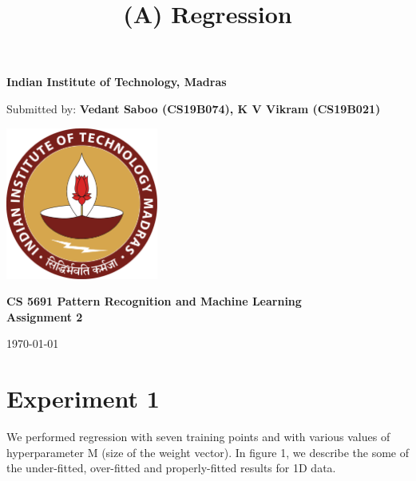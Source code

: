 \documentclass[11pt]{article}
\begin{document}
\begin{titlepage}


\setlength{\droptitle}{-4em} 
\center

{\huge \bfseries Indian Institute of Technology, Madras} %
\\[2cm] 


\begin{minipage}{0.8\textwidth}
\begin{center} \large
Submitted by: \textbf{Vedant Saboo (CS19B074), K V Vikram (CS19B021)} %
\end{center}
\end{minipage} 

\vspace{10em}

\includegraphics[width=5cm]{logo.pdf}

\vspace{10em}
\begin{minipage}{0.5\textwidth}
\begin{center} \large
\textbf{CS 5691 Pattern Recognition and Machine Learning} %
\\[0.5cm]
\textbf{Assignment 2} %
\end{center}
\end{minipage} 

\vspace{5em}
{\large \today}


\end{titlepage}


\begin{center}
\title*{\LARGE \textbf{(A) Regression}}
\end{center}

\section*{Experiment 1}
We performed regression with seven training points and with various values of hyperparameter M (size of the weight vector). In figure 1, we describe the some of the under-fitted, over-fitted and properly-fitted results for 1D data.
\end{document}
